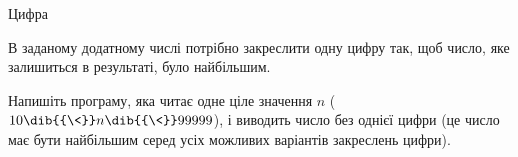 \begin{problemAllDefault}{Цифра}

В заданому додатному числі потрібно закреслити одну цифру так, щоб число, яке залишиться в результаті, було найбільшим.

Напишіть програму, яка читає одне ціле значення $n$ ($10\dib{{\<}}n\dib{{\<}}99999$), і виводить число без однієї цифри (це число має бути найбільшим серед усіх можливих варіантів закреслень цифри).

\Examples
\begin{exampleSimple}{3em}{3em}%
%
\end{exampleSimple}
\begin{exampleSimple}{3em}{3em}%
%
\end{exampleSimple}

\end{problemAllDefault}
